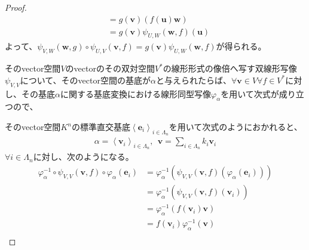\documentclass[dvipdfmx]{jsarticle}
\begin{document}
\begin{proof}
\begin{align*}
&= g\left( \mathbf{v} \right)\left( f\left( \mathbf{u} \right)\mathbf{w} \right)\\
&= g\left( \mathbf{v} \right)\psi_{U,W}\left( \mathbf{w},f \right)\left( \mathbf{u} \right)
\end{align*}
よって、$\psi_{V,W}\left( \mathbf{w},g \right) \circ \psi_{U,V}\left( \mathbf{v},f \right) = g\left( \mathbf{v} \right)\psi_{U,W}\left( \mathbf{w},f \right)$が得られる。\par
そのvector空間$V$のvectorのその双対空間$V^{*}$の線形形式の像倍へ写す双線形写像$\psi_{V,V}$について、そのvector空間の基底が$\alpha$と与えられたらば、$\forall\mathbf{v} \in V\forall f \in V^{*}$に対し、その基底$\alpha$に関する基底変換における線形同型写像$\varphi_{\alpha}$を用いて次式が成り立つので、
\begin{center}
\end{center}
そのvector空間$K^{n}$の標準直交基底$\left\langle \mathbf{e}_{i} \right\rangle_{i \in \varLambda_{n}}$を用いて次式のようにおかれると、
\begin{align*}
\alpha = \left\langle \mathbf{v}_{i} \right\rangle_{i \in \varLambda_{n}},\ \ \mathbf{v} = \sum_{i \in \varLambda_{n}} {k_{i}\mathbf{v}_{i}}
\end{align*}
$\forall i \in \varLambda_{n}$に対し、次のようになる。
\begin{align*}
\varphi_{\alpha}^{- 1} \circ \psi_{V,V}\left( \mathbf{v},f \right) \circ \varphi_{\alpha}\left( \mathbf{e}_{i} \right) &= \varphi_{\alpha}^{- 1}\left( \psi_{V,V}\left( \mathbf{v},f \right)\left( \varphi_{\alpha}\left( \mathbf{e}_{i} \right) \right) \right)\\
&= \varphi_{\alpha}^{- 1}\left( \psi_{V,V}\left( \mathbf{v},f \right)\left( \mathbf{v}_{i} \right) \right)\\
&= \varphi_{\alpha}^{- 1}\left( f\left( \mathbf{v}_{i} \right)\mathbf{v} \right)\\
&= f\left( \mathbf{v}_{i} \right)\varphi_{\alpha}^{- 1}\left( \mathbf{v} \right)\\

\end{align*}
\end{proof}
\end{document}
